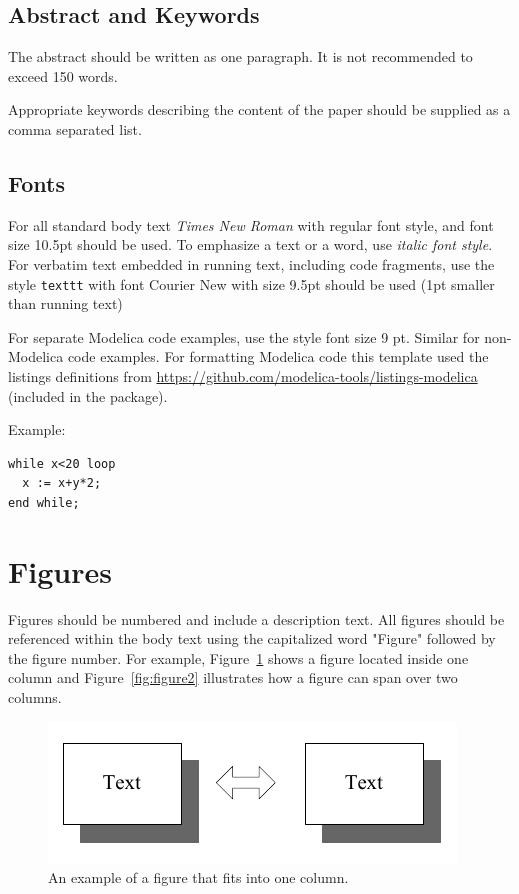 \documentclass{modelica}
\begin{document}
\subsection{Abstract and Keywords}

The abstract should be written as one paragraph. It is not recommended
to exceed 150 words.

Appropriate keywords describing the content of the paper should be
supplied as a comma separated list.

\subsection{Fonts}

For all standard body text \textit{Times New Roman} with regular font style, and font size 10.5pt should be used. To emphasize a text or a word, use \textit{italic font style}. For verbatim text embedded in running text, including code fragments, use the style {\small\texttt{texttt}} with font Courier New with size 9.5pt should be used (1pt smaller than running text)

For separate Modelica code examples, use the style font size 9 pt.  Similar for non-Modelica code examples. For formatting Modelica code this template used the listings definitions from \href{https://github.com/modelica-tools/listings-modelica}{\url{https://github.com/modelica-tools/listings-modelica}} (included in the package).

Example:

\begin{lstlisting}
while x<20 loop
  x := x+y*2;
end while;
\end{lstlisting}


\section{Figures}

Figures should be numbered and include a description text. All figures
should be referenced within the body text using the capitalized word
"Figure" followed by the figure number. For example,
Figure~\ref{fig:figure1} shows a figure located inside one column and
Figure~\ref{fig:figure2} illustrates how a figure can span over two
columns.

\begin{figure}[b]
\centering
\includegraphics[width=0.4 \textwidth]{resources/figure1}
\caption{An example of a figure that fits into one column.}
\label{fig:figure1}
\end{figure}
\end{document}

